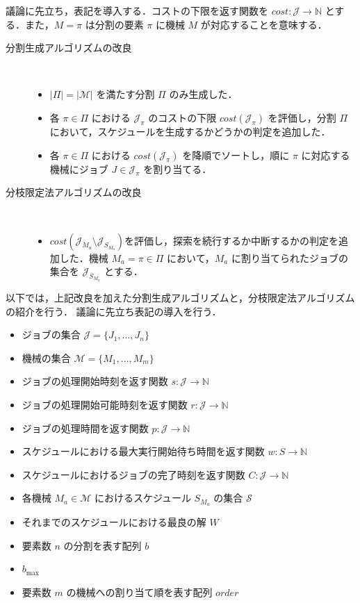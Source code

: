 \documentclass[12pt]{optlab-bachelor}
\begin{document}
議論に先立ち，表記を導入する．コストの下限を返す関数を $cost : \mathcal{J} \to \mathbb{N}$ とする．また，$M = \pi$ は分割の要素 $\pi$ に機械 $M$ が対応することを意味する．
\begin{description}
  \item[分割生成アルゴリズムの改良] ~
  \begin{itemize}
    \item $|\Pi| = |\mathcal{M}|$ を満たす分割 $\Pi$ のみ生成した．

    \item 各 $\pi \in \Pi$ における $\mathcal{J}_{\pi}$ のコストの下限 $cost(\mathcal{J}_{\pi})$ を評価し，分割 $\Pi$ において，スケジュールを生成するかどうかの判定を追加した．

    \item 各 $\pi \in \Pi$ における $cost(\mathcal{J}_{\pi})$ を降順でソートし，順に $\pi$ に対応する機械にジョブ $J \in \mathcal{J}_{\pi}$ を割り当てる．

  \end{itemize}
  \item[分枝限定法アルゴリズムの改良] ~
  \begin{itemize}
    \item $cost(\mathcal{J}_{M_a} \setminus \mathcal{J}_{S_{M_a}})$を評価し，探索を続行するか中断するかの判定を追加した．機械 $M_a = \pi \in \Pi$ において，$M_a$ に割り当てられたジョブの集合を $\mathcal{J}_{S_{M_a}}$ とする．
  \end{itemize}
\end{description}

以下では，上記改良を加えた分割生成アルゴリズムと，分枝限定法アルゴリズムの紹介を行う．
議論に先立ち表記の導入を行う．

\begin{itemize}
  \item ジョブの集合 $\mathcal{J} = \{J_1,\ldots,J_n\}$
  \item 機械の集合 $\mathcal{M} = \{M_1,\ldots,M_m\}$
  \item ジョブの処理開始時刻を返す関数 $s : \mathcal{J} \to \mathbb{N}$
  \item ジョブの処理開始可能時刻を返す関数 $r : \mathcal{J} \to \mathbb{N}$
  \item ジョブの処理時間を返す関数 $p : \mathcal{J} \to \mathbb{N}$
  \item スケジュールにおける最大実行開始待ち時間を返す関数 $w : S \to \mathbb{N}$
  \item スケジュールにおけるジョブの完了時刻を返す関数 $C : \mathcal{J} \to \mathbb{N}$
  \item 各機械 $M_a \in \mathcal{M}$ におけるスケジュール $S_{M_a}$ の集合 $\mathcal{S}$
  \item それまでのスケジュールにおける最良の解 $W$
  \item 要素数 $n$ の分割を表す配列 $b$
  \item $b_{\max}$
  \item 要素数 $m$ の機械への割り当て順を表す配列 $order$

\end{itemize}
\end{document}
